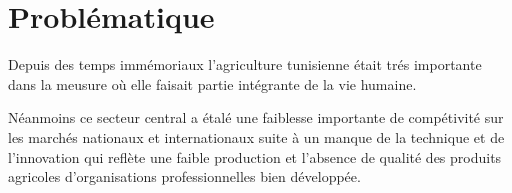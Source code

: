 \section{Problématique }
Depuis des temps immémoriaux l'agriculture tunisienne était trés importante dans la meusure où elle faisait partie intégrante de la vie humaine.


Néanmoins ce secteur central a étalé une faiblesse importante de compétivité sur les marchés nationaux et internationaux suite à un manque de la technique et de l'innovation qui reflète une faible production et l'absence de qualité des produits agricoles d'organisations professionnelles bien développée.
